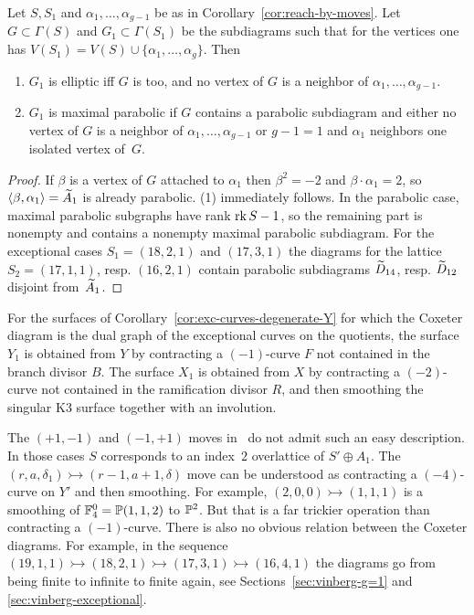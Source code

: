 \documentclass{amsart}
\begin{document}
\begin{lemma}\label{lem:subgraphs-G-G1}
  Let $S,S_1$ and $\alpha_1,\dotsc,\alpha_{g-1}$ be as in
  Corollary~\ref{cor:reach-by-moves}. Let $G\subset\Gamma(S)$ and
  $G_1\subset\Gamma(S_1)$ be the subdiagrams such that for the
  vertices one has $V(S_1) = V(S) \cup \{\alpha_1,\dotsc,\alpha_g\}$.
  Then
  \begin{enumerate}
  \item $G_1$ is elliptic iff $G$ is too, and no vertex of $G$ is a
    neighbor of $\alpha_1,\dotsc,\alpha_{g-1}$.
  \item $G_1$ is maximal parabolic if $G$ contains a parabolic
    subdiagram and either no vertex of $G$ is a
    neighbor of $\alpha_1,\dotsc,\alpha_{g-1}$ or $g-1=1$ and
    $\alpha_1$ neighbors one isolated vertex of~$G$. 
  \end{enumerate}
\end{lemma}
\begin{proof}
  If $\beta$ is a vertex of $G$ attached to $\alpha_1$ then
  $\beta^2=-2$ and $\beta\cdot \alpha_1=2$, so
  $\langle\beta,\alpha_1\rangle = {\widetilde A}_1$ is already parabolic. (1) immediately
  follows. In the parabolic case, maximal parabolic subgraphs have rank
  $\operatorname{rk} S-1$, so the remaining part is nonempty and contains a
  nonempty maximal parabolic subdiagram. For the exceptional
  cases $S_1=(18,2,1)$ and $(17,3,1)$ the diagrams for the lattice
  $S_2=(17,1,1)$, resp. $(16,2,1)$ contain parabolic subdiagrams
  ${\widetilde D}_{14}$, resp. ${\widetilde D}_{12}$ disjoint from~${\widetilde A}_1$. 
\end{proof}

\begin{lemma}\label{lem:heegner-surfaces}
  For the surfaces of Corollary~\ref{cor:exc-curves-degenerate-Y} for
  which the Coxeter diagram is the dual graph of the exceptional
  curves on the quotients, the surface $Y_{1}$ is obtained from $Y$ by
  contracting a $(-1)$-curve $F$ not contained in the branch divisor $B$.
  The surface $X_{1}$ is obtained from $X$ by contracting a $(-2)$-curve
  not contained in the ramification divisor $R$, and then smoothing
  the singular K3 surface together with an involution.
\end{lemma}

\begin{remark}\label{rem:the-other-move}
  The $(+1,-1)$ and $(-1,+1)$ moves in \fign\ do not admit such an
  easy description. In those cases $S$ corresponds to an index~$2$
  overlattice of $S'\oplus A_1$.  The
  $(r,a,\delta_1)\rightarrowtail (r-1,a+1,\delta)$ move can be understood as
  contracting a $(-4)$-curve on $Y'$ and then smoothing. For example,
  $(2,0,0)\rightarrowtail (1,1,1)$ is a smoothing of ${\mathbb F}_4^0={\mathbb P}(1,1,2)$ to
  ${\mathbb P}^2$. But that is a far trickier operation than contracting a
  $(-1)$-curve. 
  There is also no obvious relation between the Coxeter
  diagrams. For example, in the sequence $(19,1,1) \rightarrowtail (18,2,1) \rightarrowtail
  (17,3,1) \rightarrowtail (16,4,1)$ the diagrams go from being finite to infinite to
  finite again, see Sections~\ref{sec:vinberg-g=1} and
  \ref{sec:vinberg-exceptional}. 
\end{remark}
\end{document}

